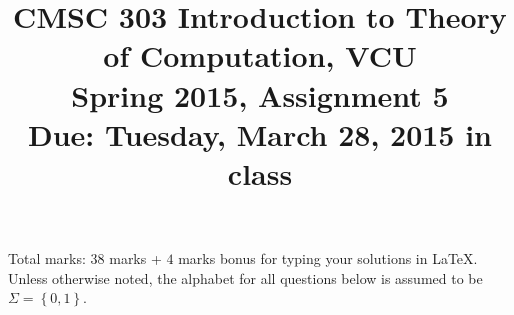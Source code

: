 \documentclass{article}
\newcommand{\set}[1]{{\left\{#1\right\}}}    %
\begin{document}
\title{CMSC 303 Introduction to Theory of Computation, VCU\\Spring 2015, Assignment 5\\Due: Tuesday, March 28, 2015 in class}
\date{}
\maketitle
\vspace{-5mm}
\noindent Total marks: $38$ marks + $4$ marks bonus for typing your solutions in LaTeX.\vspace{2mm}\\

\noindent Unless otherwise noted, the alphabet for all questions below is assumed to be $\Sigma=\set{0,1}$.
\end{document}
